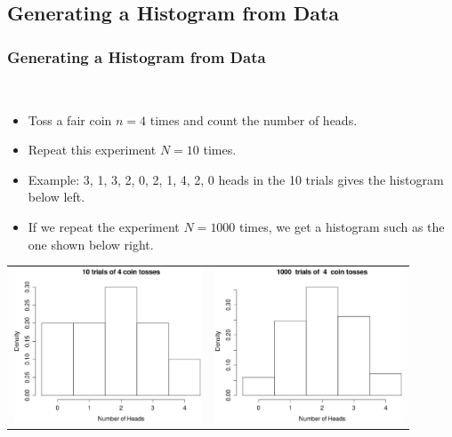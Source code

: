 \documentclass[t]{beamer}
\begin{document}
\subsection{Generating a Histogram from Data}
\begin{frame}[t]\frametitle{Generating a Histogram from Data}
{\ }\vspace{-20pt}

{\small
\begin{itemize}
\item Toss a fair coin $n=4$ times and count the number of heads.
\item Repeat this experiment $N=10$ times.
\item Example:  3, 1, 3, 2, 0, 2, 1, 4, 2, 0 heads in the 10 trials gives the histogram
below left.  
\item If we repeat the experiment $N=1000$ times, we get a histogram such as the one
shown below right.
\vspace{-.24in}

\end{itemize}
\begin{center}
\begin{tabular}{cc}
\includegraphics[height=1.8in]{CoinTrials.eps} &
\includegraphics[height=1.8in]{CoinTrials2.eps}
\end{tabular}
\end{center}
}
\end{frame}
\end{document}
